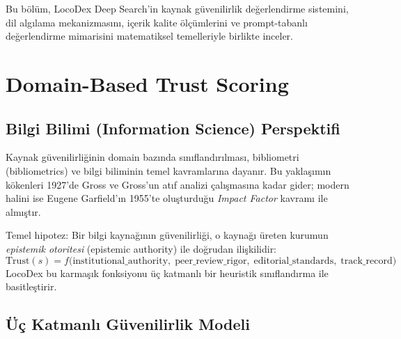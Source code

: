 
Bu b\"{o}l\"{u}m, LocoDex Deep Search'in kaynak g\"{u}venilirlik de\u{g}erlendirme sistemini, dil alg{\i}lama mekanizmas{\i}n{\i}, i\c{c}erik kalite \"{o}l\c{c}\"{u}mlerini ve prompt-tabanl{\i} de\u{g}erlendirme mimarisini matematiksel temelleriyle birlikte inceler.

\section{Domain-Based Trust Scoring}
\label{sec:domain-trust}

\subsection{Bilgi Bilimi (Information Science) Perspektifi}

Kaynak g\"{u}venilirli\u{g}inin domain baz{\i}nda s{\i}n{\i}fland{\i}r{\i}lmas{\i}, bibliometri (bibliometrics) ve bilgi biliminin temel kavramlar{\i}na dayan{\i}r. Bu yakla\c{s}{\i}m{\i}n k\"{o}kenleri 1927'de Gross ve Gross'un at{\i}f analizi \c{c}al{\i}\c{s}mas{\i}na kadar gider; modern halini ise Eugene Garfield'{\i}n 1955'te olu\c{s}turdu\u{g}u \emph{Impact Factor} kavram{\i} ile alm{\i}\c{s}t{\i}r.

\begin{formulbox}
Temel hipotez: Bir bilgi kayna\u{g}{\i}n{\i}n g\"{u}venilirli\u{g}i, o kayna\u{g}{\i} \"{u}reten kurumun \emph{epistemik otoritesi} (epistemic authority) ile do\u{g}rudan ili\c{s}kilidir:
\begin{equation}
\label{eq:trust-function}
\mathrm{Trust}(s) = f\bigl(\text{institutional\_authority},\; \text{peer\_review\_rigor},\; \text{editorial\_standards},\; \text{track\_record}\bigr)
\end{equation}
LocoDex bu karma\c{s}{\i}k fonksiyonu \"{u}\c{c} katmanl{\i} bir heuristik s{\i}n{\i}fland{\i}rma ile basitle\c{s}tirir.
\end{formulbox}

\subsection{\"{U}\c{c} Katmanl{\i} G\"{u}venilirlik Modeli}

